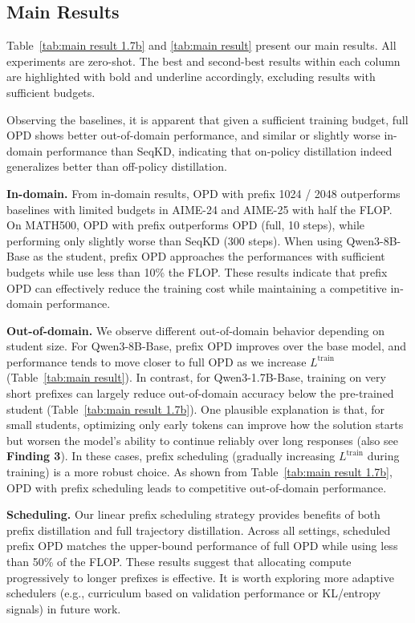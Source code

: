 \documentclass[11pt]{article}
\begin{document}
\subsection{Main Results}  


Table~\ref{tab:main result 1.7b} and \ref{tab:main result} present our main results. 
All experiments are zero-shot. 
The best and second-best results within each column are highlighted with bold and underline accordingly, excluding results with sufficient budgets.


Observing the baselines, it is apparent that given a sufficient training budget, full OPD shows better out-of-domain performance, and similar or slightly worse in-domain performance than SeqKD, indicating that on-policy distillation indeed generalizes better than off-policy distillation.

\noindent \textbf{In-domain.} 
From in-domain results, OPD with prefix 1024 / 2048 outperforms baselines with limited budgets in AIME-24 and AIME-25 with half the FLOP. On MATH500, OPD with prefix outperforms OPD (full, 10 steps), while performing only slightly worse than SeqKD (300 steps).
When using Qwen3-8B-Base as the student, prefix OPD approaches the performances with sufficient budgets while use less than 10\% the FLOP.
These results indicate that prefix OPD can effectively reduce the training cost while maintaining a competitive in-domain performance. 

\noindent \textbf{Out-of-domain.}  
We observe different out-of-domain behavior depending on student size.  
For Qwen3-8B-Base, prefix OPD improves over the base model, and performance  
tends to move closer to full OPD as we increase $L^{\text{train}}$  
(Table~\ref{tab:main result}).  
In contrast, for Qwen3-1.7B-Base, training on very short prefixes can largely reduce  
out-of-domain accuracy below the pre-trained student (Table~\ref{tab:main result 1.7b}).  
One plausible explanation is that, for small students, optimizing only early tokens  
can improve how the solution starts but worsen the model’s ability to continue reliably  
over long responses (also see \textbf{Finding 3}).  
In these cases, prefix scheduling (gradually increasing $L^{\text{train}}$ during training)  
is a more robust choice. 
As shown from Table~\ref{tab:main result 1.7b}, OPD with prefix scheduling leads to competitive out-of-domain performance.

\noindent \textbf{Scheduling.} 
Our linear prefix scheduling strategy provides benefits of both prefix distillation and full trajectory distillation. Across all settings, scheduled prefix OPD matches the upper-bound performance of full OPD while using less than 50\% of the FLOP. These results suggest that allocating compute progressively to longer prefixes is effective. It is worth exploring more adaptive schedulers (e.g., curriculum based on validation performance or KL/entropy signals) in future work. 
\end{document}
